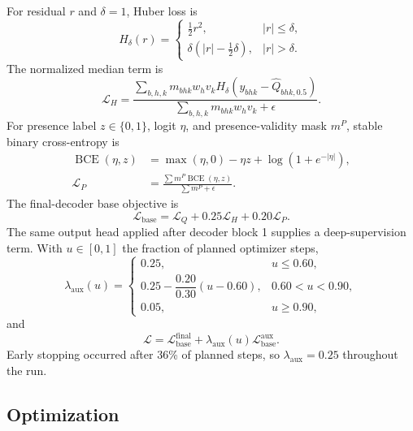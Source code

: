 \documentclass[10pt,letterpaper]{article}
\numberwithin{equation}{section}
\theoremstyle{definition}
\theoremstyle{remark}
\begin{document}
For residual \(r\) and \(\delta=1\), Huber loss is
\begin{equation}
H_\delta(r)=
\begin{cases}
\tfrac12r^2,&|r|\leq\delta,\\
\delta(|r|-\tfrac12\delta),&|r|>\delta.
\end{cases}
\label{eq:huber}
\end{equation}
The normalized median term is
\begin{equation}
\mathcal{L}_H=
\frac{\sum_{b,h,k}m_{bhk}w_hv_k
H_\delta(y_{bhk}-\widehat Q_{bhk,0.5})}
{\sum_{b,h,k}m_{bhk}w_hv_k+\epsilon}.
\label{eq:huber-loss}
\end{equation}
For presence label \(z\in\{0,1\}\), logit \(\eta\), and presence-validity mask
\(m^P\), stable binary cross-entropy is
\begin{align}
\operatorname{BCE}(\eta,z)
&=\max(\eta,0)-\eta z+\log(1+e^{-|\eta|}),\nonumber\\
\mathcal{L}_P
&=\frac{\sum m^P\operatorname{BCE}(\eta,z)}
{\sum m^P+\epsilon}.
\label{eq:bce}
\end{align}
The final-decoder base objective is
\begin{equation}
\mathcal{L}_{\mathrm{base}}
=\mathcal{L}_Q+0.25\mathcal{L}_H+0.20\mathcal{L}_P.
\label{eq:base-loss}
\end{equation}
The same output head applied after decoder block 1 supplies a deep-supervision
term. With \(u\in[0,1]\) the fraction of planned optimizer steps,
\begin{equation}
\lambda_{\mathrm{aux}}(u)=
\begin{cases}
0.25,&u\leq0.60,\\
0.25-\dfrac{0.20}{0.30}(u-0.60),&0.60<u<0.90,\\
0.05,&u\geq0.90,
\end{cases}
\label{eq:aux-schedule}
\end{equation}
and
\begin{equation}
\mathcal{L}
=\mathcal{L}_{\mathrm{base}}^{\mathrm{final}}
+\lambda_{\mathrm{aux}}(u)
\mathcal{L}_{\mathrm{base}}^{\mathrm{aux}}.
\label{eq:total-loss}
\end{equation}
Early stopping occurred after 36\% of planned steps, so
\(\lambda_{\mathrm{aux}}=0.25\) throughout the run.

\subsection{Optimization}
\end{document}
